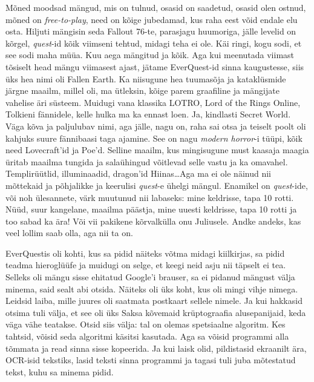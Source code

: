 Mõned moodsad mängud, mis on tulnud, osasid on saadetud, osasid olen ostnud, mõned on \emph{free-to-play}, need on kõige jubedamad, kus raha eest võid endale elu osta. Hiljuti mängisin seda Fallout 76-te, parasjagu huumoriga, jälle  levelid on kõrgel, \emph{quest}-id kõik viimseni tehtud, midagi teha ei ole. Käi ringi, kogu sodi, et see sodi maha müüa. Kuu aega mängitud ja kõik. Aga kui meenutada viimast tõsiselt head mängu viimasest ajast, jätame EverQuest-id sinna kaugustesse, siis üks hea nimi oli Fallen Earth. Ka niisugune hea  tuumasõja ja kataklüsmide järgne maailm, millel oli, ma ütleksin, kõige parem graafiline ja mängijate vahelise äri süsteem. Muidugi vana klassika LOTRO, Lord of the Rings Online, Tolkieni fännidele, kelle hulka ma ka ennast loen. Ja, kindlasti Secret World. Väga kõva ja paljulubav nimi, aga jälle, nagu on, raha sai otsa ja teiselt poolt oli kahjuks suure fännibaasi taga ajamine. See on nagu \emph{modern horror}-i tüüpi,  kõik need Lovecraft'id ja Poe'd. Selline maailm, kus mingisugune must kaasaja maagia üritab  maailma tungida ja salaühingud võitlevad selle vastu ja ka omavahel. Templirüütlid, illuminaadid, dragon'id Hiinas\ldots  Aga ma ei ole näinud nii mõttekaid ja põhjalikke ja keerulisi \emph{quest}-e ühelgi mängul. Enamikel on \emph{quest}-ide, või noh ülesannete, värk muutunud nii labaseks: mine keldrisse, tapa 10 rotti. Nüüd, suur kangelane, maailma päästja, mine uuesti keldrisse, tapa 10 rotti ja too sabad ka ära! Või vii pakikene kõrvalkülla onu Juliusele. Andke andeks, kas veel lollim saab olla, aga nii ta on.

EverQuestis oli kohti, kus sa pidid näiteks võtma midagi kiilkirjas, sa pidid teadma  hieroglüüfe ja muidugi on selge, et keegi neid asju nii täpselt ei tea. Selleks oli mängu sisse ehitatud Google'i brauser, sa ei pidanud mängust välja minema, said sealt abi otsida. Näiteks oli üks koht, kus oli mingi vihje nimega. Leidsid laiba, mille juures oli saatmata postkaart sellele nimele. Ja kui hakkasid otsima tuli välja, et see oli üks Saksa kõvemaid krüptograafia alusepanijaid, keda väga vähe teatakse. Otsid siis välja: tal on olemas spetsiaalne algoritm. Kes tahtsid, võisid seda algoritmi käsitsi kasutada. Aga sa võisid  programmi alla tõmmata ja read sinna sisse kopeerida. Ja kui laisk olid, pildistasid ekraanilt ära, OCR-isid tekstiks, lasid teksti sinna programmi ja tagasi tuli juba mõtestatud tekst, kuhu sa minema pidid.